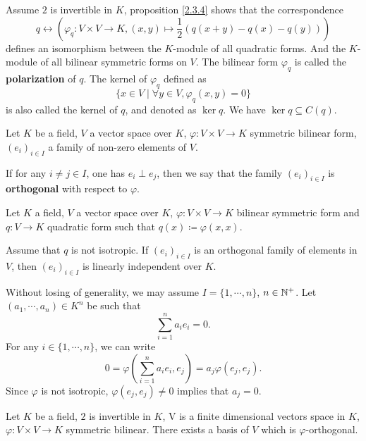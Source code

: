 \begin{remark}
    Assume $2$ is invertible in $K$, proposition \ref{2.3.4} shows that the correspondence
    $$ q\leftrightarrow \left(\varphi_q : V\times V\rightarrow K, (x,y) \mapsto \frac{1}{2} \left(q(x+y) - q(x) -q(y)\right)\right)$$
    defines an isomorphism between the $K$-module of all quadratic forms. And the $K$-module of all bilinear symmetric forms on $V$. The bilinear form $\varphi_q$ is called the \textbf{polarization} of $q$. The kernel of $\varphi_q$ defined as 
    $$\{x\in V\mid  \forall y\in V, \varphi_q(x,y) = 0\}$$
    is also called the kernel of $q$, and denoted as $\ker q$. We have $\ker q\subseteq C(q)$.
\end{remark}
\begin{definitionenv}
    Let $K$ be a field, $V$ a vector space over $K$, $\varphi:V\times V\rightarrow K$ symmetric bilinear form, $\left(e_i\right)_{i\in I}$ a family of non-zero elements of $V$.
    
    \quad If for any $i\neq j\in I$, one has $e_i\perp e_j$, then we say that the family $\left(e_i\right)_{i\in I}$ is \textbf{orthogonal} with respect to $\varphi$.
\end{definitionenv}
\begin{propositionenv}
    Let $K$ a field, $V$ a vector space over $K$, $\varphi:V\times V\rightarrow K$ bilinear symmetric form and $q: V\rightarrow K$ quadratic form such that $q(x)\coloneq \varphi(x,x)$.

    \quad Assume that $q$ is not isotropic. If $\left(e_i\right)_{i\in I}$ is an orthogonal family of elements in $V$, then $\left(e_i\right)_{i\in I}$ is linearly independent over $K$.
\end{propositionenv}
\begin{proofenv}
    Without losing of generality, we may assume $I=\{1,\cdots,n\}$, $n\in \mathbb{N}^+$. Let $\left(a_1,\cdots,a_n\right)\in K^n$ be such that 
    $$ \sum_{i=1}^{n} a_i e_i = 0.$$
    For any $i\in \{1,\cdots,n\}$, we can write 
    $$0 = \varphi\left(\sum_{i=1}^{n}a_i e_i ,e_j\right) = a_j \varphi(e_j,e_j).$$
    Since $\varphi$ is not isotropic, $\varphi(e_j,e_j)\neq 0 $ implies that $a_j=0$.
\end{proofenv}
\begin{propositionenv}
    Let $K$ be a field, $2$ is invertible in $K$, V is a finite dimensional vectors space in $K$, $\varphi : V\times V\rightarrow K$ symmetric bilinear. There exists a basis of $V$ which is $\varphi$-orthogonal.
\end{propositionenv}
